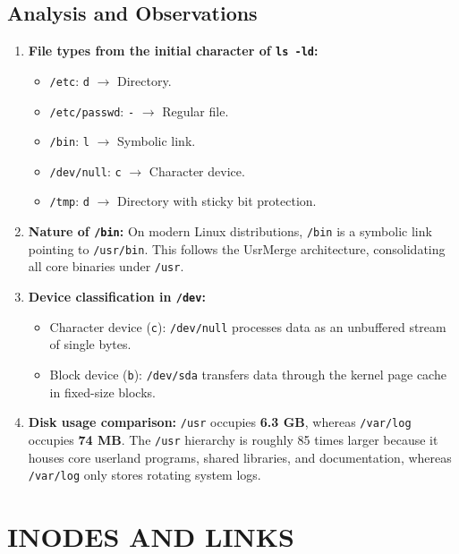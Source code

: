 \documentclass[12pt,a4paper]{report}
\numberwithin{equation}{chapter}
\numberwithin{figure}{chapter}
\numberwithin{table}{chapter}
\begin{document}
\section{Analysis and Observations}
\begin{enumerate}
    \item \textbf{File types from the initial character of \texttt{ls -ld}:}
    \begin{itemize}
        \item \texttt{/etc}: \texttt{d} $\rightarrow$ Directory.
        \item \texttt{/etc/passwd}: \texttt{-} $\rightarrow$ Regular file.
        \item \texttt{/bin}: \texttt{l} $\rightarrow$ Symbolic link.
        \item \texttt{/dev/null}: \texttt{c} $\rightarrow$ Character device.
        \item \texttt{/tmp}: \texttt{d} $\rightarrow$ Directory with sticky bit protection.
    \end{itemize}
    \item \textbf{Nature of \texttt{/bin}:} On modern Linux distributions, \texttt{/bin} is a symbolic link pointing to \texttt{/usr/bin}. This follows the UsrMerge architecture, consolidating all core binaries under \texttt{/usr}.
    \item \textbf{Device classification in \texttt{/dev}:}
    \begin{itemize}
        \item Character device (\texttt{c}): \texttt{/dev/null} processes data as an unbuffered stream of single bytes.
        \item Block device (\texttt{b}): \texttt{/dev/sda} transfers data through the kernel page cache in fixed-size blocks.
    \end{itemize}
    \item \textbf{Disk usage comparison:} \texttt{/usr} occupies \textbf{6.3 GB}, whereas \texttt{/var/log} occupies \textbf{74 MB}. The \texttt{/usr} hierarchy is roughly 85 times larger because it houses core userland programs, shared libraries, and documentation, whereas \texttt{/var/log} only stores rotating system logs.
\end{enumerate}

\chapter{INODES AND LINKS}
\end{document}
